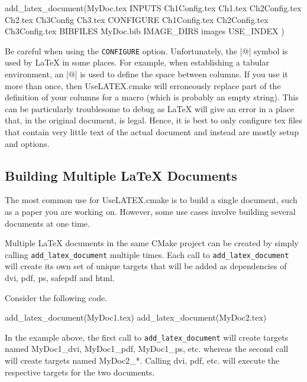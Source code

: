 \documentclass{article}
\newcommand*{\textfile}[1]{\textsf{#1}}
\newcommand*{\textcmake}[1]{\texttt{#1}}
\newcommand*{\textmaketarget}[1]{#1}
\newcommand*{\UseLATEX}{\textfile{UseLATEX.cmake}\xspace}
\newcommand*{\latex}{\LaTeX\xspace}
\newcommand*{\ald}{\textcmake{add\_latex\_document}\xspace}
\begin{document}
  \begin{CodeListing}
add_latex_document(MyDoc.tex
  INPUTS Ch1Config.tex Ch1.tex Ch2Config.tex
         Ch2.tex Ch3Config Ch3.tex
  CONFIGURE Ch1Config.tex Ch2Config.tex Ch3Config.tex
  BIBFILES MyDoc.bib
  IMAGE_DIRS images
  USE_INDEX
  )
  \end{CodeListing}

  Be careful when using the \textcmake{CONFIGURE} option. Unfortunately,
  the \textlatex|@| symbol is used by \latex in some places. For example,
  when establishing a tabular environment, an \textlatex|@| is used to
  define the space between columns. If you use it more than once, then
  \UseLATEX will erroneously replace part of the definition of your columns
  for a macro (which is probably an empty string). This can be particularly
  troublesome to debug as \latex will give an error in a place that, in the
  original document, is legal. Hence, it is best to only configure tex
  files that contain very little text of the actual document and instead
  are mostly setup and options.

  \subsection{Building Multiple \latex Documents}
  \label{sec:BuldingMultipleLatexDocuments}

  The most common use for \UseLATEX is to build a single document, such as
  a paper you are working on. However, some use cases involve building
  several documents at one time.

  Multiple \latex documents in the same CMake project can be created by
  simply calling \ald multiple times. Each call to \ald will create its own
  set of unique targets that will be added as dependencies of
  \textmaketarget{dvi}, \textmaketarget{pdf}, \textmaketarget{ps},
  \textmaketarget{safepdf} and \textmaketarget{html}.

  Consider the following code.

  \begin{CodeListing}
add_latex_document(MyDoc1.tex)
add_latex_document(MyDoc2.tex)
  \end{CodeListing}

  In the example above, the first call to \ald will create targets named
  \textmaketarget{MyDoc1\_dvi}, \textmaketarget{MyDoc1\_pdf},
  \textmaketarget{MyDoc1\_ps}, etc. whereas the second call will create
  targets named \textmaketarget{MyDoc2\_*}. Calling \textmaketarget{dvi},
  \textmaketarget{pdf}, etc. will execute the respective targets for the
  two documents.
\end{document}
